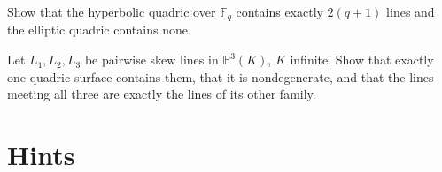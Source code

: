 \begin{exercise}[$\star\star$]\label{ex:linesFq}
Show that the hyperbolic quadric over $\mathbb F_q$ contains exactly $2(q+1)$ lines and the elliptic quadric contains none.
\end{exercise}

\begin{exercise}[$\star\star\star$]\label{ex:skewlines}
Let $L_1,L_2,L_3$ be pairwise skew lines in $\mathbb P^3(K)$, $K$ infinite. Show that exactly one quadric surface contains them, that it is
nondegenerate, and that the lines meeting all three are exactly the lines of its other family.
\end{exercise}

\section{Hints}

